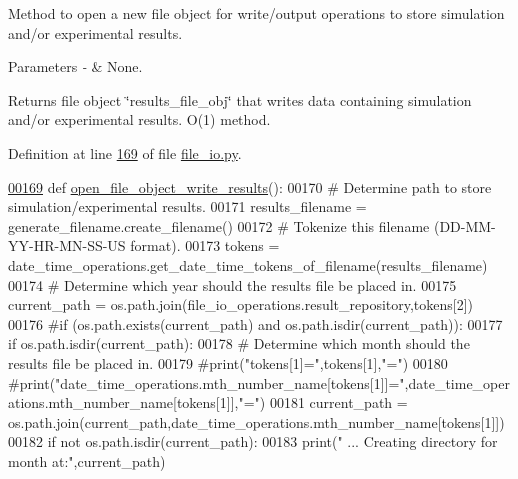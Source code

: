 Method to open a new file object for write/output operations to store simulation and/or experimental results. 


\begin{DoxyParams}{Parameters}
{\em -\/} & None. \\
\hline
\end{DoxyParams}
\begin{DoxyReturn}{Returns}
file object \char`\"{}results\+\_\+file\+\_\+obj\char`\"{} that writes data containing simulation and/or experimental results. O(1) method. 
\end{DoxyReturn}


Definition at line \hyperlink{file__io_8py_source_l00169}{169} of file \hyperlink{file__io_8py_source}{file\+\_\+io.\+py}.


\begin{DoxyCode}
\hypertarget{classutilities_1_1file__io_1_1file__io__operations_l00169}{}\hyperlink{classutilities_1_1file__io_1_1file__io__operations_ad091638ea961413dba6775d065c0d589}{00169}     \textcolor{keyword}{def }\hyperlink{classutilities_1_1file__io_1_1file__io__operations_ad091638ea961413dba6775d065c0d589}{open\_file\_object\_write\_results}():
00170         \textcolor{comment}{# Determine path to store simulation/experimental results.}
00171         results\_filename = generate\_filename.create\_filename()
00172         \textcolor{comment}{# Tokenize this filename (DD-MM-YY-HR-MN-SS-US format).}
00173         tokens = date\_time\_operations.get\_date\_time\_tokens\_of\_filename(results\_filename)
00174         \textcolor{comment}{# Determine which year should the results file be placed in.}
00175         current\_path = os.path.join(file\_io\_operations.result\_repository,tokens[2])
00176         \textcolor{comment}{#if (os.path.exists(current\_path) and os.path.isdir(current\_path)):}
00177         \textcolor{keywordflow}{if} os.path.isdir(current\_path):
00178             \textcolor{comment}{# Determine which month should the results file be placed in.}
00179             \textcolor{comment}{#print("tokens[1]=",tokens[1],"=")}
00180             \textcolor{comment}{
      #print("date\_time\_operations.mth\_number\_name[tokens[1]]=",date\_time\_operations.mth\_number\_name[tokens[1]],"=")}
00181             current\_path = os.path.join(current\_path,date\_time\_operations.mth\_number\_name[tokens[1]])
00182             \textcolor{keywordflow}{if} \textcolor{keywordflow}{not} os.path.isdir(current\_path):
00183                 print(\textcolor{stringliteral}{" ... Creating directory for month at:"},current\_path)

\end{DoxyCode}
